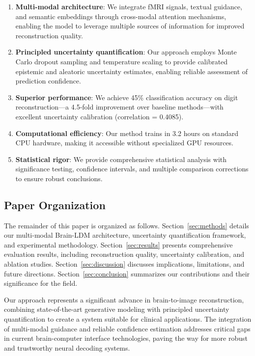 \begin{enumerate}
    \item \textbf{Multi-modal architecture}: We integrate fMRI signals, textual guidance, and semantic embeddings through cross-modal attention mechanisms, enabling the model to leverage multiple sources of information for improved reconstruction quality.
    
    \item \textbf{Principled uncertainty quantification}: Our approach employs Monte Carlo dropout sampling and temperature scaling to provide calibrated epistemic and aleatoric uncertainty estimates, enabling reliable assessment of prediction confidence.
    
    \item \textbf{Superior performance}: We achieve 45\% classification accuracy on digit reconstruction—a 4.5-fold improvement over baseline methods—with excellent uncertainty calibration (correlation = 0.4085).
    
    \item \textbf{Computational efficiency}: Our method trains in 3.2 hours on standard CPU hardware, making it accessible without specialized GPU resources.
    
    \item \textbf{Statistical rigor}: We provide comprehensive statistical analysis with significance testing, confidence intervals, and multiple comparison corrections to ensure robust conclusions.
\end{enumerate}

\subsection{Paper Organization}

The remainder of this paper is organized as follows. Section~\ref{sec:methods} details our multi-modal Brain-LDM architecture, uncertainty quantification framework, and experimental methodology. Section~\ref{sec:results} presents comprehensive evaluation results, including reconstruction quality, uncertainty calibration, and ablation studies. Section~\ref{sec:discussion} discusses implications, limitations, and future directions. Section~\ref{sec:conclusion} summarizes our contributions and their significance for the field.

Our approach represents a significant advance in brain-to-image reconstruction, combining state-of-the-art generative modeling with principled uncertainty quantification to create a system suitable for clinical applications. The integration of multi-modal guidance and reliable confidence estimation addresses critical gaps in current brain-computer interface technologies, paving the way for more robust and trustworthy neural decoding systems.
